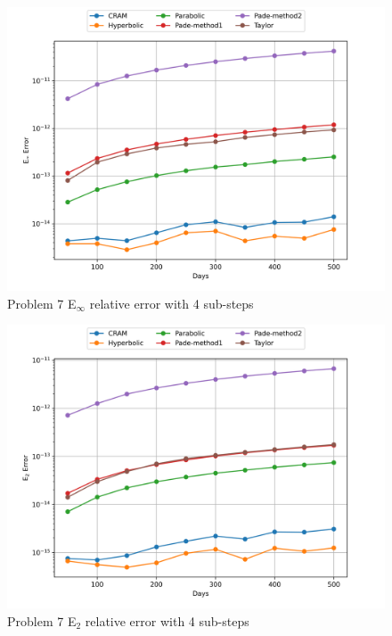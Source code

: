 \begin{figure}[p]
    \centering
    \includegraphics[width=6in]{images/chapter-5/progressionProblems/problem7/problem7EinfErrorerrorSteps4.png}
    \caption{Problem 7 E${}_{\infty}$ relative error with 4 sub-steps}
    \label{fig:problem7_Einf_error_with_steps4}
\end{figure}

\begin{figure}[p]
    \centering
    \includegraphics[width=6in]{images/chapter-5/progressionProblems/problem7/problem7E2ErrorerrorSteps4.png}
    \caption{Problem 7 E${}_{2}$ relative error with 4 sub-steps}
    \label{fig:problem7_E2_error_with_steps4}
\end{figure}

